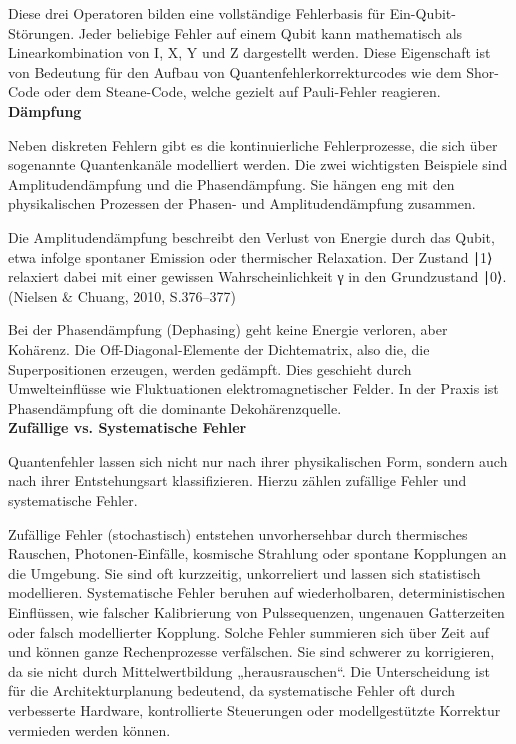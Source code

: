Diese drei Operatoren bilden eine vollständige Fehlerbasis für Ein-Qubit-Störungen. Jeder beliebige Fehler auf einem Qubit kann mathematisch als Linearkombination von I, X, Y und Z dargestellt werden. Diese Eigenschaft ist von Bedeutung für den Aufbau von Quantenfehlerkorrekturcodes wie dem Shor-Code oder dem Steane-Code, welche gezielt auf Pauli-Fehler reagieren.  \cite[Seite 252-253]{rieffelQuantumComputingGentle2011a}\\


\textbf{Dämpfung}

Neben diskreten Fehlern gibt es die kontinuierliche Fehlerprozesse, die sich über sogenannte Quantenkanäle modelliert werden. Die zwei wichtigsten Beispiele sind Amplitudendämpfung und die Phasendämpfung. Sie hängen eng mit den physikalischen Prozessen der Phasen- und Amplitudendämpfung zusammen.

Die Amplitudendämpfung beschreibt den Verlust von Energie durch das Qubit, etwa infolge spontaner Emission oder thermischer Relaxation. Der Zustand ∣1⟩ relaxiert dabei mit einer gewissen Wahrscheinlichkeit γ in den Grundzustand ∣0⟩. \cite[Seite 380-383]{nielsen_quantum_2010}\\
(Nielsen & Chuang, 2010, S.376–377)

Bei der Phasendämpfung (Dephasing) geht keine Energie verloren, aber Kohärenz. Die Off-Diagonal-Elemente der Dichtematrix, also die, die Superpositionen erzeugen, werden gedämpft. Dies geschieht durch Umwelteinflüsse wie Fluktuationen elektromagnetischer Felder. In der Praxis ist Phasendämpfung oft die dominante Dekohärenzquelle. \cite[Seite 383-386]{nielsen_quantum_2010}\\


\textbf{Zufällige vs. Systematische Fehler}

Quantenfehler lassen sich nicht nur nach ihrer physikalischen Form, sondern auch nach ihrer Entstehungsart klassifizieren. Hierzu zählen zufällige Fehler und systematische Fehler.

Zufällige Fehler (stochastisch) entstehen unvorhersehbar durch thermisches Rauschen, Photonen-Einfälle, kosmische Strahlung oder spontane Kopplungen an die Umgebung. Sie sind oft kurzzeitig, unkorreliert und lassen sich statistisch modellieren.
Systematische Fehler beruhen auf wiederholbaren, deterministischen Einflüssen, wie falscher Kalibrierung von Pulssequenzen, ungenauen Gatterzeiten oder falsch modellierter Kopplung. Solche Fehler summieren sich über Zeit auf und können ganze Rechenprozesse verfälschen. Sie sind schwerer zu korrigieren, da sie nicht durch Mittelwertbildung „herausrauschen“.\cite[Seite 3-5]{Quantum error correction below the surface code threshold_2024}
Die Unterscheidung ist für die Architekturplanung bedeutend, da systematische Fehler oft durch verbesserte Hardware, kontrollierte Steuerungen oder modellgestützte Korrektur vermieden werden können.

